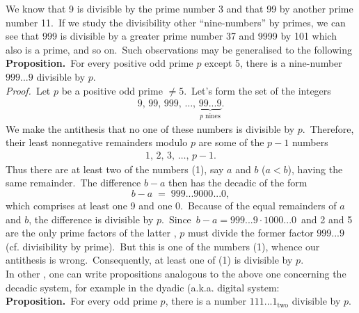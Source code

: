\documentclass[12pt]{article}
\theoremstyle{definition}
\begin{document}
We know that 9 is divisible by the prime number 3 and that 99 by another prime number 11.\, If we study the divisibility other ``nine-numbers'' by primes, we can see that 999 is divisible by a greater prime number 37 and 9999 by 101 which also is a prime, and so on.\, Such observations may be generalised to the following\\

\textbf{Proposition.}\, For every positive odd prime $p$ except 5, there is a nine-number $999...9$ divisible by $p$.\\

\emph{Proof.}\, Let $p$ be a positive odd prime $\neq 5$.\, Let's form the set of the integers
\begin{align}
9,\,99,\,999,\,\ldots,\, \underbrace{99...9}_{p\; \mathrm{nines}}.
\end{align}
We make the antithesis that no one of these numbers is divisible by $p$.\, Therefore, their least nonnegative remainders modulo $p$ are some of the $p\!-\!1$ numbers
\begin{align}
1,\,2,\,3,\,\ldots,\,p\!-\!1.
\end{align}
Thus there are at least two of the numbers (1), say $a$ and $b$ ($a< b$), having the same remainder.\, The difference 
$b\!-\!a$ then has the decadic  of the form
$$b\!-\!a \;=\; 999...9000...0,$$
which comprises at least one 9 and one 0.\, Because of the equal remainders of $a$ and $b$, the difference is divisible by $p$.\, Since\, $b\!-\!a = 999...9\!\cdot\!1000...0$\, and 2 and 5 are the only prime factors of the latter , $p$ must divide the former factor $999...9$ (cf. divisibility by prime).\, But this is one of the numbers (1), whence our antithesis is wrong.\, Consequently, at least one of (1) is divisible by $p$.\\

In other , one can write propositions analogous to the above one concerning the decadic system, for example in the dyadic (a.k.a.  digital system:\\

\textbf{Proposition.}\, For every odd prime $p$, there is a number $111...1_{\mathrm{two}}$ divisible by $p$.

\end{document}
